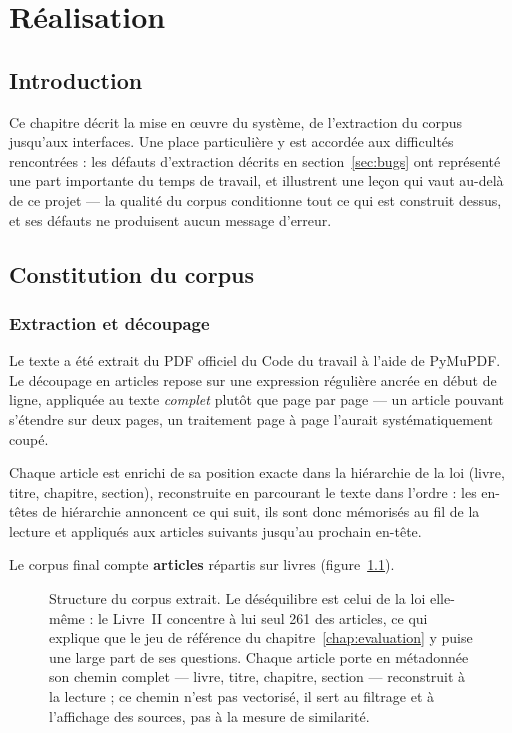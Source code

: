 \chapter{Réalisation}
\label{chap:realisation}

\section*{Introduction}

Ce chapitre décrit la mise en œuvre du système, de l'extraction du corpus jusqu'aux interfaces.
Une place particulière y est accordée aux difficultés rencontrées : les défauts d'extraction
décrits en section~\ref{sec:bugs} ont représenté une part importante du temps de travail, et
illustrent une leçon qui vaut au-delà de ce projet --- la qualité du corpus conditionne tout ce
qui est construit dessus, et ses défauts ne produisent aucun message d'erreur.

\section{Constitution du corpus}

\subsection{Extraction et découpage}

Le texte a été extrait du PDF officiel du Code du travail à l'aide de PyMuPDF. Le découpage en
articles repose sur une expression régulière ancrée en début de ligne, appliquée au texte
\emph{complet} plutôt que page par page --- un article pouvant s'étendre sur deux pages, un
traitement page à page l'aurait systématiquement coupé.

Chaque article est enrichi de sa position exacte dans la hiérarchie de la loi (livre, titre,
chapitre, section), reconstruite en parcourant le texte dans l'ordre : les en-têtes de hiérarchie
annoncent ce qui suit, ils sont donc mémorisés au fil de la lecture et appliqués aux articles
suivants jusqu'au prochain en-tête.

Le corpus final compte \textbf{\NbArticles{} articles} répartis sur \NbLivres{} livres
(figure~\ref{fig:corpus}).

\begin{figure}[htbp]
  \centering
  
  \caption[Structure du corpus extrait]{Structure du corpus extrait. Le déséquilibre est celui de
  la loi elle-même : le Livre~II concentre à lui seul 261 des \NbArticles{} articles, ce qui
  explique que le jeu de référence du chapitre~\ref{chap:evaluation} y puise une large part de ses
  questions. Chaque article porte en métadonnée son chemin complet --- livre, titre, chapitre,
  section --- reconstruit à la lecture ; ce chemin n'est pas vectorisé, il sert au filtrage et à
  l'affichage des sources, pas à la mesure de similarité.}
  \label{fig:corpus}
\end{figure}

